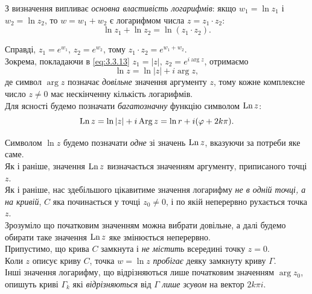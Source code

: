 З визначення випливає \textit{основна властивість логарифмів}: якщо $w_1 = \ln z_1$ і $w_2 = \ln z_2$, то $w = w_1 + w_2$ є логарифмом числа $z = z_1 \cdot z_2$:
\begin{equation}
	\label{eq:3.3.13}
	\ln z_1 + \ln z_2 = \ln (z_1 \cdot z_2).
\end{equation}

Справді, $z_1 = e^{w_1}$, $z_2 = e^{w_2}$, тому $z_1 \cdot z_2 = e^{w_1 + w_2}$. \\

Зокрема, покладаючи в \eqref{eq:3.3.13} $z_1 = |z|$, $z_2 = e^{i \arg z}$, отримаємо
\begin{equation}
	\label{eq:3.3.14}
	\ln z = \ln |z| + i \arg z,
\end{equation}
де символ $\arg z$ позначає \textit{довільне} значення аргументу $z$, тому кожне комплексне число $z \ne 0$ має нескінченну кількість логарифмів. \\

Для ясності будемо позначати \textit{багатозначну} функцію символом $\operatorname{Ln} z$:
\begin{equation}
	\label{eq:3.3.15}
	\operatorname{Ln} z = \ln |z| + i \operatorname{Arg} z = \ln r + i (\varphi + 2 k \pi).
\end{equation}

Символом $\ln z$ будемо позначати \textit{одне} зі значень $\operatorname{Ln} z$, вказуючи за потреби яке саме. \\

Як і раніше, значення $\operatorname{Ln} z$ визначається значенням аргументу, приписаного точці $z$. \\

Як і раніше, нас здебільшого цікавитиме значення логарифму \textit{не в одній точці, а на кривій}, $C$ яка починається у точці $z_0 \ne 0$, і по якій неперервно рухається точка $z$. \\

Зрозуміло що початковим значенням можна вибрати довільне, а далі будемо обирати таке значення $\operatorname{Ln} z$ яке змінюється неперервно. \\

Припустимо, що крива $C$ замкнута і \textit{не містить} всередині точку $z = 0$. \\

Коли $z$ описує криву $C$, точка $w = \ln z$ \textit{пробігає} деяку замкнуту криву $\Gamma$. \\

Інші значення логарифму, що відрізняються лише початковим значенням $\arg z_0$, опишуть криві $\Gamma_k$ які \textit{відрізняються} від $\Gamma$ \textit{лише зсувом} на вектор $2 k \pi i$. \\

